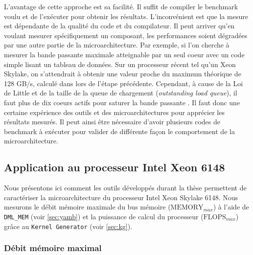         L'avantage de cette approche est sa facilité. Il suffit de compiler le benchmark voulu et de l'exécuter pour obtenir les résultats. L'inconvénient est que la mesure est dépendante de la qualité du code et du compilateur. Il peut arriver qu'en voulant mesurer spécifiquement un composant, les performances soient dégradées par une autre partie de la microarchitecture. Par exemple, si l'on cherche à mesurer la bande passante maximale atteignable par un seul coeur avec un code simple lisant un tableau de données. Sur un processeur récent tel qu'un Xeon Skylake, on s'attendrait à obtenir une valeur proche du maximum théorique de 128 GB/s, calculé dans lors de l'étape précédente. Cependant, à cause de la Loi de Little \cite{little2008little} et de la taille de la queue de chargement (\textit{outstanding load queue}), il faut plus de dix coeurs actifs pour saturer la bande passante \cite{JohnMcCalpin2010}. Il faut donc une certaine expérience des outils et des microarchitectures pour apprécier les résultats mesurés. Il peut ainsi être nécessaire d'avoir plusieurs codes de benchmark à exécuter pour valider de différente façon le comportement de la microarchitecture.
        


  
\subsection{Application au processeur Intel Xeon 6148}
    
    Nous présentons ici comment les outils développés durant la thèse permettent de caractériser la microarchitecture du processeur Intel Xeon Skylake 6148. Nous mesurons le débit mémoire maximale du bus mémoire ($\text{MEMORY}_{max}$) à l'aide de \verb=DML_MEM= (voir \autoref{sec:yamb}) et la puissance de calcul du processeur ($\text{FLOPS}_{max}$) grâce au \verb=Kernel Generator= (voir \autoref{sec:kg}).


    \subsubsection{Débit mémoire maximal}
        
